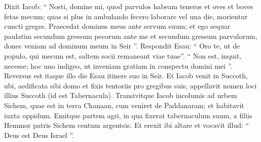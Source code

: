 \begin{biblechapter}
\begin{biblechapter}
\begin{biblechapter}
\begin{biblechapter}
\begin{biblechapter}
\begin{biblechapter}
\begin{biblechapter}
\begin{biblechapter}
\begin{biblechapter}
\begin{biblechapter}
\begin{biblechapter}
\begin{biblechapter}
\begin{biblechapter}
\begin{biblechapter}
\begin{biblechapter}
\begin{biblechapter}
\begin{biblechapter}
\begin{biblechapter}
\begin{biblechapter}
\begin{biblechapter}
\begin{biblechapter}
\begin{biblechapter}
\begin{biblechapter}
\begin{biblechapter}
\begin{biblechapter}
\begin{biblechapter}
\begin{biblechapter}
\begin{biblechapter}
\begin{biblechapter}
\begin{biblechapter}
\begin{biblechapter}
\begin{biblechapter}
\begin{biblechapter}
\verse Dixit Iacob: “ Nosti, domine mi, quod parvulos habeam teneros et oves et boves fetas mecum; quas si plus in ambulando fecero laborare vel una die, morientur cuncti greges. 
\verse Praecedat dominus meus ante servum suum; et ego sequar paulatim secundum gressum pecorum ante me et secundum gressum parvulorum, donec veniam ad dominum meum in Seir ”. 
\verse Respondit Esau: “ Oro te, ut de populo, qui mecum est, saltem socii remaneant viae tuae”. “ Non est, inquit, necesse; hoc uno indigeo, ut inveniam gratiam in conspectu domini mei ”.
 \verse Reversus est itaque illo die Esau itinere suo in Seir.
 \verse Et Iacob venit in Succoth, ubi, aedificata sibi domo et fixis tentoriis pro gregibus suis, appellavit nomen loci illius Succoth (id est Tabernacula).
 \verse Transivitque Iacob incolumis ad urbem Sichem, quae est in terra Chanaan, cum veniret de Paddanaram; et habitavit iuxta oppidum. 
\verse Emitque partem agri, in qua fixerat tabernaculum suum, a filiis Hemmor patris Sichem centum argenteis. 
\verse Et erexit ibi altare et vocavit illud: “ Deus est Deus Israel ”.
 

\end{biblechapter}
\end{biblechapter}
\end{biblechapter}
\end{biblechapter}
\end{biblechapter}
\end{biblechapter}
\end{biblechapter}
\end{biblechapter}
\end{biblechapter}
\end{biblechapter}
\end{biblechapter}
\end{biblechapter}
\end{biblechapter}
\end{biblechapter}
\end{biblechapter}
\end{biblechapter}
\end{biblechapter}
\end{biblechapter}
\end{biblechapter}
\end{biblechapter}
\end{biblechapter}
\end{biblechapter}
\end{biblechapter}
\end{biblechapter}
\end{biblechapter}
\end{biblechapter}
\end{biblechapter}
\end{biblechapter}
\end{biblechapter}
\end{biblechapter}
\end{biblechapter}
\end{biblechapter}
\end{biblechapter}

